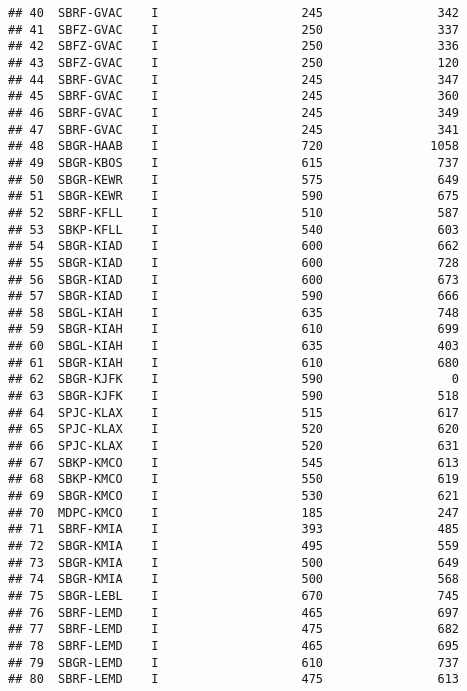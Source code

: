 \documentclass[
]{article}
\begin{document}
\begin{verbatim}
## 40  SBRF-GVAC    I                    245                342
## 41  SBFZ-GVAC    I                    250                337
## 42  SBFZ-GVAC    I                    250                336
## 43  SBFZ-GVAC    I                    250                120
## 44  SBRF-GVAC    I                    245                347
## 45  SBRF-GVAC    I                    245                360
## 46  SBRF-GVAC    I                    245                349
## 47  SBRF-GVAC    I                    245                341
## 48  SBGR-HAAB    I                    720               1058
## 49  SBGR-KBOS    I                    615                737
## 50  SBGR-KEWR    I                    575                649
## 51  SBGR-KEWR    I                    590                675
## 52  SBRF-KFLL    I                    510                587
## 53  SBKP-KFLL    I                    540                603
## 54  SBGR-KIAD    I                    600                662
## 55  SBGR-KIAD    I                    600                728
## 56  SBGR-KIAD    I                    600                673
## 57  SBGR-KIAD    I                    590                666
## 58  SBGL-KIAH    I                    635                748
## 59  SBGR-KIAH    I                    610                699
## 60  SBGL-KIAH    I                    635                403
## 61  SBGR-KIAH    I                    610                680
## 62  SBGR-KJFK    I                    590                  0
## 63  SBGR-KJFK    I                    590                518
## 64  SPJC-KLAX    I                    515                617
## 65  SPJC-KLAX    I                    520                620
## 66  SPJC-KLAX    I                    520                631
## 67  SBKP-KMCO    I                    545                613
## 68  SBKP-KMCO    I                    550                619
## 69  SBGR-KMCO    I                    530                621
## 70  MDPC-KMCO    I                    185                247
## 71  SBRF-KMIA    I                    393                485
## 72  SBGR-KMIA    I                    495                559
## 73  SBGR-KMIA    I                    500                649
## 74  SBGR-KMIA    I                    500                568
## 75  SBGR-LEBL    I                    670                745
## 76  SBRF-LEMD    I                    465                697
## 77  SBRF-LEMD    I                    475                682
## 78  SBRF-LEMD    I                    465                695
## 79  SBGR-LEMD    I                    610                737
## 80  SBRF-LEMD    I                    475                613

\end{verbatim}
\end{document}
